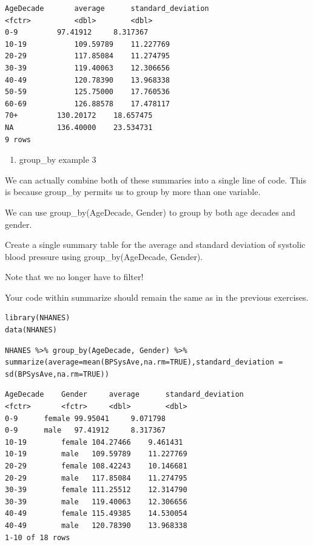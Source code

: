 \documentclass[
]{article}
\providecommand{\tightlist}{%
  \setlength{\itemsep}{0pt}\setlength{\parskip}{0pt}}
\begin{document}
\begin{verbatim}
AgeDecade       average      standard_deviation
<fctr>          <dbl>        <dbl>
0-9         97.41912     8.317367
10-19           109.59789    11.227769
20-29           117.85084    11.274795
30-39           119.40063    12.306656
40-49           120.78390    13.968338
50-59           125.75000    17.760536
60-69           126.88578    17.478117
70+         130.20172    18.657475
NA          136.40000    23.534731
9 rows
\end{verbatim}

\begin{enumerate}
\def\labelenumi{\arabic{enumi}.}
\setcounter{enumi}{6}
\tightlist
\item
  group\_by example 3
\end{enumerate}

We can actually combine both of these summaries into a single line of
code. This is because group\_by permits us to group by more than one
variable.

We can use group\_by(AgeDecade, Gender) to group by both age decades and
gender.

Create a single summary table for the average and standard deviation of
systolic blood pressure using group\_by(AgeDecade, Gender).

Note that we no longer have to filter!

Your code within summarize should remain the same as in the previous
exercises.

\begin{verbatim}
library(NHANES)
data(NHANES)
\end{verbatim}

\begin{verbatim}
NHANES %>% group_by(AgeDecade, Gender) %>% summarize(average=mean(BPSysAve,na.rm=TRUE),standard_deviation = sd(BPSysAve,na.rm=TRUE))
\end{verbatim}

\begin{verbatim}
AgeDecade    Gender     average      standard_deviation
<fctr>       <fctr>     <dbl>        <dbl>
0-9      female 99.95041     9.071798
0-9      male   97.41912     8.317367
10-19        female 104.27466    9.461431
10-19        male   109.59789    11.227769
20-29        female 108.42243    10.146681
20-29        male   117.85084    11.274795
30-39        female 111.25512    12.314790
30-39        male   119.40063    12.306656
40-49        female 115.49385    14.530054
40-49        male   120.78390    13.968338
1-10 of 18 rows
\end{verbatim}
\end{document}
